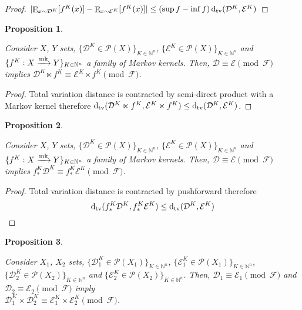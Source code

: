\documentclass{article}
\numberwithin{equation}{section}
\theoremstyle{definition}
\theoremstyle{plain}
\newtheorem{proposition}{Proposition}[section]
\DeclareMathOperator{\E}{E}
\newcommand{\Dtv}{\operatorname{d}_{\textnormal{tv}}}
\newcommand{\Nats}{\mathbb{N}}
\newcommand{\Abs}[1]{\lvert #1 \rvert}
\newcommand{\Dist}{\mathcal{D}}
\newcommand{\Fall}{\mathcal{F}}
\newcommand{\Markov}{\xrightarrow{\textnormal{mk}}}
\begin{document}
\begin{proof}

$\Abs{\E_{x \sim \Dist^K}[f^K(x)] - \E_{x \sim \mathcal{E}^K}[f^K(x)]} \leq  (\sup f - \inf f)\Dtv(\Dist^K, \mathcal{E}^K)$
\end{proof}

\begin{samepage}
\begin{proposition}
\label{prp:prob_cong_semidir}

Consider $X$, $Y$ sets, $\{\Dist^K \in \mathcal{P}(X)\}_{K \in \Nats^n}$, $\{\mathcal{E}^K \in \mathcal{P}(X)\}_{K \in \Nats^n}$ and ${\{f^K: X \Markov Y\}_{K \in \Nats^n}}$ a family of Markov kernels. Then, $\Dist \equiv \mathcal{E} \pmod \Fall$ implies $\Dist^K \ltimes f^K \equiv \mathcal{E}^K \ltimes f^K \pmod \Fall$.

\end{proposition}
\end{samepage}

\begin{proof}

Total variation distance is contracted by semi-direct product with a Markov kernel therefore $\Dtv(\Dist^K \ltimes f^K, \mathcal{E}^K \ltimes f^K) \leq \Dtv(\Dist^K, \mathcal{E}^K)$.
\end{proof}

\begin{samepage}
\begin{proposition}
\label{prp:prob_cong_push}

Consider $X$, $Y$ sets, $\{\Dist^K \in \mathcal{P}(X)\}_{K \in \Nats^n}$, $\{\mathcal{E}^K \in \mathcal{P}(X)\}_{K \in \Nats^n}$ and ${\{f^K: X \Markov Y\}_{K \in \Nats^n}}$ a family of Markov kernels. Then, $\Dist \equiv \mathcal{E} \pmod \Fall$ implies $f_*^K\Dist^K \equiv f_*^K\mathcal{E}^K \pmod \Fall$.

\end{proposition}
\end{samepage}

\begin{proof}

Total variation distance is contracted by pushforward therefore \[\Dtv(f_*^K\Dist^K, f_*^K\mathcal{E}^K) \leq \Dtv(\Dist^K, \mathcal{E}^K)\]
\end{proof}

\begin{samepage}
\begin{proposition}
\label{prp:prob_cong_dir}

Consider $X_1$, $X_2$ sets, $\{\Dist_1^K \in \mathcal{P}(X_1)\}_{K \in \Nats^n}$, $\{\mathcal{E}_1^K \in \mathcal{P}(X_1)\}_{K \in \Nats^n}$, $\{\Dist_2^K \in \mathcal{P}(X_2)\}_{K \in \Nats^n}$ and $\{\mathcal{E}_2^K \in \mathcal{P}(X_2)\}_{K \in \Nats^n}$. Then, $\Dist_1 \equiv \mathcal{E}_1 \pmod \Fall$ and $\Dist_2 \equiv \mathcal{E}_2 \pmod \Fall$ imply\\ ${\Dist_1^K \times \Dist_2^K \equiv \mathcal{E}_1^K \times \mathcal{E}_2^K \pmod \Fall}$. 

\end{proposition}
\end{samepage}
\end{document}
